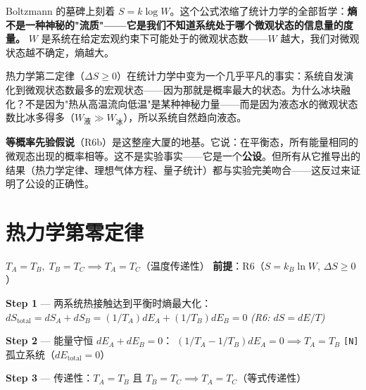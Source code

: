 \begin{insightbox}[统计力学的核心洞察：熵 = 无知的对数]
  Boltzmann 的墓碑上刻着 $S = k \log W$。这个公式浓缩了统计力学的全部哲学：\textbf{熵不是一种神秘的"流质"——它是我们不知道系统处于哪个微观状态的信息量的度量。} $W$ 是系统在给定宏观约束下可能处于的微观状态数——$W$ 越大，我们对微观状态越不确定，熵越大。

  热力学第二定律（$\Delta S \ge 0$）在统计力学中变为一个几乎平凡的事实：系统自发演化到微观状态数最多的宏观状态——因为那就是概率最大的状态。为什么冰块融化？不是因为"热从高温流向低温"是某种神秘力量——而是因为液态水的微观状态数比冰多得多（$W_{\text{液}} \gg W_{\text{冰}}$），所以系统自然趋向液态。

  \textbf{等概率先验假说}（R6b）是这整座大厦的地基。它说：在平衡态，所有能量相同的微观态出现的概率相等。这不是实验事实——它是一个\textbf{公设}。但所有从它推导出的结果（热力学定律、理想气体方程、量子统计）都与实验完美吻合——这反过来证明了公设的正确性。
\end{insightbox}


\section{热力学第零定律}

\begin{lawbox}[热力学第零定律]
  $T_A = T_B,\; T_B = T_C \implies T_A = T_C$（温度传递性）
  \quad\textbf{前提}：R6（$S = k_B\ln W$, $\Delta S \ge 0$）
\end{lawbox}

\begin{derivationbox}[推导]
  \textbf{Step 1} — 两系统热接触达到平衡时熵最大化：
  $dS_{\text{total}} = dS_A + dS_B = (1/T_A)dE_A + (1/T_B)dE_B = 0$
  \hfill\textit{(R6: $dS = dE/T$)}

  \textbf{Step 2} — 能量守恒 $dE_A + dE_B = 0$：
  $(1/T_A - 1/T_B)dE_A = 0 \implies T_A = T_B$
  \hfill\texttt{[N]} 孤立系统（$dE_{\text{total}}=0$）

  \textbf{Step 3} — 传递性：$T_A = T_B$ 且 $T_B = T_C \implies T_A = T_C$（等式传递性）
\end{derivationbox}

